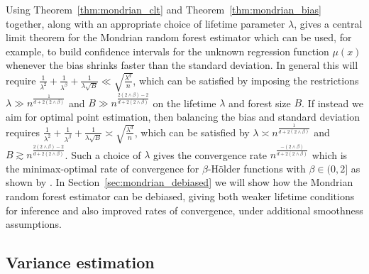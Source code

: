 \documentclass[11pt,lof]{puthesis}
\theoremstyle{break}
\theoremstyle{proof}
\begin{document}
Using Theorem~\ref{thm:mondrian_clt} and Theorem~\ref{thm:mondrian_bias}
together,
along with an appropriate choice of lifetime parameter $\lambda$,
gives a central limit theorem for the Mondrian random forest estimator
which can be used, for example, to build confidence intervals
for the unknown regression function $\mu(x)$
whenever the bias shrinks faster than the standard deviation.
In general this will require
$\frac{1}{\lambda^2} + \frac{1}{\lambda^\beta} + \frac{1}{\lambda \sqrt B}
\ll \sqrt{\frac{\lambda^d}{n}}$,
which can be satisfied by imposing the restrictions
$\lambda \gg n^{\frac{1}{d + 2(2 \wedge \beta)}}$
and $B \gg n^{\frac{2(2 \wedge \beta) - 2}{d + 2(2 \wedge \beta)}}$
on the lifetime $\lambda$ and forest size $B$.
If instead we aim for optimal point estimation,
then balancing the bias and standard deviation requires
$\frac{1}{\lambda^2} + \frac{1}{\lambda^\beta} + \frac{1}{\lambda \sqrt B}
\asymp \sqrt{\frac{\lambda^d}{n}}$,
which can be satisfied by
$\lambda \asymp n^{\frac{1}{d + 2(2 \wedge \beta)}}$
and $B \gtrsim n^{\frac{2(2 \wedge \beta) - 2}{d + 2(2 \wedge \beta)}}$.
Such a choice of $\lambda$ gives the convergence rate
$n^{\frac{-(2 \wedge \beta)}{d + 2(2 \wedge \beta)}}$
which is the minimax-optimal rate of convergence \citep{stone1982optimal}
for $\beta$-H{\"o}lder functions with $\beta \in (0,2]$
as shown by \citet[Theorem~2]{mourtada2020minimax}.
In Section~\ref{sec:mondrian_debiased} we will show how the Mondrian random
forest
estimator can be debiased, giving both weaker lifetime conditions for inference
and also improved rates of convergence, under additional smoothness assumptions.

\subsection*{Variance estimation}
\end{document}
